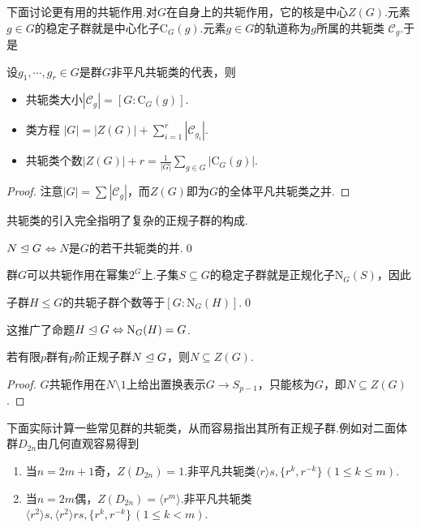 下面讨论更有用的共轭作用.对$G$在自身上的共轭作用，它的核是中心$Z(G)$.元素$g\in G$的稳定子群就是中心化子$\mathrm{C}_G(g)$.元素$g\in G$的轨道称为$g$所属的{\heiti 共轭类} $\mathcal{C}_g$.于是
\begin{thm}
	设$g_1,\cdots,g_r\in G$是群$G$非平凡共轭类的代表，则
	\begin{itemize}
		\item 共轭类大小$|\mathcal{C}_{g}|=[G:\mathrm{C}_G(g)]$.
		\item {\heiti 类方程} $|G|=|Z(G)|+\displaystyle\sum_{i=1}^r|\mathcal{C}_{g_i}|$.
		\item 共轭类个数$|Z(G)|+r=\displaystyle\frac{1}{|G|}\sum_{g\in G}|\mathrm{C}_G(g)|$.
	\end{itemize}
\end{thm}
\begin{proof}
	注意$|G|=\displaystyle\sum|\mathcal{C}_g|$，而$Z(G)$即为$G$的全体平凡共轭类之并.
\end{proof}

共轭类的引入完全指明了复杂的正规子群的构成.
\begin{thm}
	$N\trianglelefteq G$$\iff$$N$是$G$的若干共轭类的并.\qed
\end{thm}

群$G$可以共轭作用在幂集$2^G$上.子集$S\subseteq G$的稳定子群就是正规化子$\mathrm{N}_G(S)$，因此
\begin{thm}
	子群$H\le G$的共轭子群个数等于$[G:\mathrm{N}_G(H)]$.\qed
\end{thm}
\begin{remark}
	这推广了命题$H\trianglelefteq G\Leftrightarrow\mathrm{N}_G(H)=G$.
\end{remark}
\begin{prop}
	若有限$p$群有$p$阶正规子群$N\trianglelefteq G$，则$N\subseteq Z(G)$.
\end{prop}
\begin{proof}
	$G$共轭作用在$N\setminus 1$上给出置换表示$G\to S_{p-1}$，只能核为$G$，即$N\subseteq Z(G)$.
\end{proof}

下面实际计算一些常见群的共轭类，从而容易指出其所有正规子群.例如对二面体群$D_{2n}$由几何直观容易得到
\begin{enumerate}
	\item 当$n=2m+1$奇，$Z(D_{2n})=1$.非平凡共轭类$\langle r\rangle s,\{r^k,r^{-k}\}\,(1\le k\le m)$.
	\item 当$n=2m$偶，$Z(D_{2n})=\langle r^m\rangle $.非平凡共轭类$\langle r^2\rangle s,\langle r^2\rangle rs,\{r^k,r^{-k}\}\,(1\le k<m)$.
\end{enumerate}

